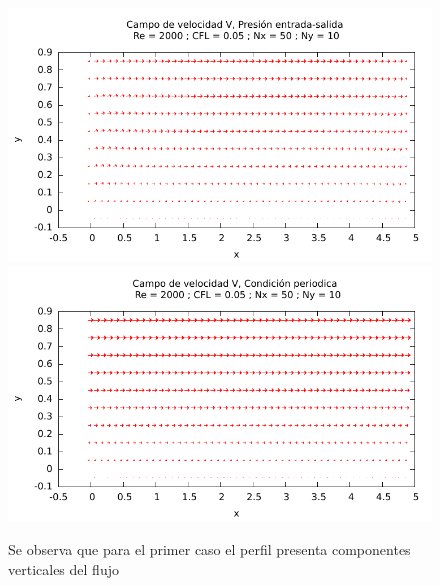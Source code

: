 \begin{figure}[H]
\centering
\includegraphics[width=1\textwidth]{./fig1_1/fig1_1/velocity_field.pdf}
\includegraphics[width=1\textwidth]{./fig1_1/velocity_field.pdf}
\caption{Se observa que para el primer caso el perfil presenta componentes verticales del flujo} \label{fig_1}
\end{figure}

